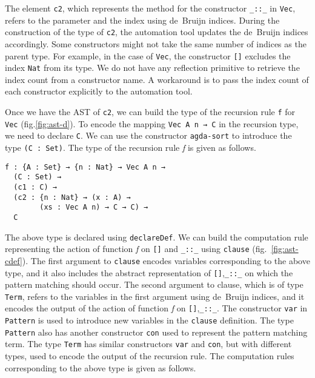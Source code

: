 \documentclass[sigplan,10pt]{acmart}
\begin{document}
The element {\tt c2}, which represents the method for the constructor {\tt \_::\_} in {\tt Vec}, refers to the parameter and the index using de~Bruijn indices. During the construction of the type of {\tt c2}, the automation tool updates the de~Bruijn indices accordingly. Some constructors might not take the same number of indices as the parent type. For example, in the case of {\tt Vec}, the constructor {\tt []} excludes the index {\tt Nat} from its type. We do not have any reflection primitive to retrieve the index count from a constructor name. A workaround is to pass the index count of each constructor explicitly to the automation tool.

Once we have the AST of {\tt c2}, we can build the type of the recursion rule {\tt f} for {\tt Vec} (fig.\ref{fig:ast-d}). To encode the mapping {\tt Vec A n → C} in the recursion type, we need to declare {\tt C}. We can use the constructor {\tt agda-sort} to introduce the type {\tt (C : Set)}. The type of the recursion rule \emph{f} is given as follows.

\begin{center}
\begingroup
\begin{BVerbatim}
f : {A : Set} → {n : Nat} → Vec A n → 
  (C : Set) → 
  (c1 : C) → 
  (c2 : {n : Nat} → (x : A) → 
        (xs : Vec A n) → C → C) → 
  C
\end{BVerbatim}
\endgroup
\end{center}

\normalsize


The above type is declared using {\tt declareDef}. We can build the computation rule representing the action of function \emph{f} on {\tt []} and {\tt \_::\_} using {\tt clause} (fig.~\ref{fig:ast-cdef}). The first argument to {\tt clause} encodes variables corresponding to the above type, and it also includes the abstract representation of {\tt []},{\tt \_::\_} on which the pattern matching should occur. The second argument to clause, which is of type {\tt Term}, refers to the variables in the first argument using de~Bruijn indices, and it encodes the output of the action of function \emph{f} on {\tt []},{\tt \_::\_}. The constructor {\tt var} in {\tt Pattern} is used to introduce new variables in the {\tt clause} definition. The type {\tt Pattern} also has another constructor {\tt con} used to represent the pattern matching term. The type {\tt Term} has similar constructors {\tt var} and {\tt con}, but with different types, used to encode the output of the recursion rule. The computation rules corresponding to the above type is given as follows.
\end{document}

